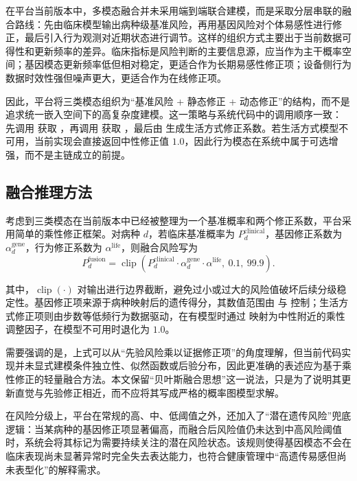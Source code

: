 在平台当前版本中，多模态融合并未采用端到端联合建模，而是采取分层串联的融合路线：先由临床模型输出病种级基准风险，再用基因风险对个体易感性进行修正，最后引入行为观测对近期状态进行调节。这样的组织方式主要出于当前数据可得性和更新频率的差异。临床指标是风险判断的主要信息源，应当作为主干概率空间；基因模态更新频率低但相对稳定，更适合作为长期易感性修正项；设备侧行为数据时效性强但噪声更大，更适合作为在线修正项。

因此，平台将三类模态组织为“基准风险 + 静态修正 + 动态修正”的结构，而不是追求统一嵌入空间下的高复杂度建模。这一策略与系统代码中的调用顺序一致： 先调用  获取 ，再调用  获取 ，最后由  生成生活方式修正系数。若生活方式模型不可用，当前实现会直接返回中性修正值 \(1.0\)，因此行为模态在系统中属于可选增强，而不是主链成立的前提。

\subsection{融合推理方法}

考虑到三类模态在当前版本中已经被整理为一个基准概率和两个修正系数，平台采用简单的乘性修正框架。对病种 \(d\)，若临床基准概率为 \(P_d^{\text{clinical}}\)，基因修正系数为 \(\alpha_d^{\text{gene}}\)，行为修正系数为 \(\alpha^{\text{life}}\)，则融合风险写为
\begin{equation}
\label{eq:fusion}
P_d^{\text{fusion}} = \operatorname{clip}\!\left(P_d^{\text{clinical}} \cdot \alpha_d^{\text{gene}} \cdot \alpha^{\text{life}},\ 0.1,\ 99.9 \right).
\end{equation}

其中，\(\operatorname{clip}(\cdot)\) 对输出进行边界截断，避免过小或过大的风险值破坏后续分级稳定性。基因修正项来源于病种映射后的遗传得分，其数值范围由  与  控制；生活方式修正项则由步数等低频行为数据驱动，在有模型时通过  映射为中性附近的乘性调整因子，在模型不可用时退化为 \(1.0\)。

需要强调的是，上式可以从“先验风险乘以证据修正项”的角度理解，但当前代码实现并未显式建模条件独立性、似然函数或后验分布，因此更准确的表述应为基于乘性修正的轻量融合方法。本文保留“贝叶斯融合思想”这一说法，只是为了说明其更新直觉与先验修正相近，而不应将其写成严格的概率图模型求解。

在风险分级上，平台在常规的高、中、低阈值之外，还加入了“潜在遗传风险”兜底逻辑：当某病种的基因修正项显著偏高，而融合后风险值仍未达到中高风险阈值时，系统会将其标记为需要持续关注的潜在风险状态。该规则使得基因模态不会在临床表现尚未显著异常时完全失去表达能力，也符合健康管理中“高遗传易感但尚未表型化”的解释需求。

